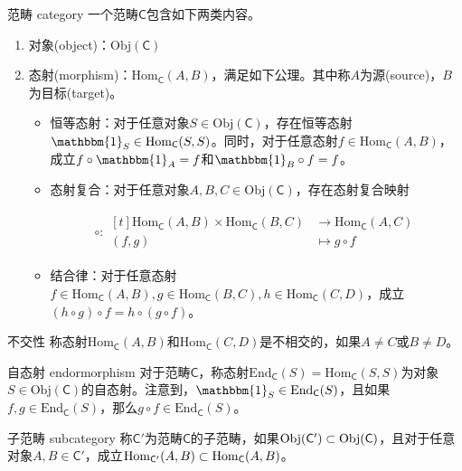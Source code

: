 \begin{definition}{范畴 category}
	一个范畴$\mathsf{C}$包含如下两类内容。
	\begin{enumerate}
		\item 对象(object)：$\mathrm{Obj}(\mathsf{C})$
		\item 态射(morphism)：$\mathrm{Hom}_\mathsf{C}(A,B)$，满足如下公理。其中称$A$为源(source)，$B$为目标(target)。
		\begin{itemize}
			\item 恒等态射：对于任意对象$S\in\mathrm{Obj}(\mathsf{C})$，存在恒等态射$\mathbbm{1}_S\in\mathrm{Hom}_\mathsf{C}(S,S)$。同时，对于任意态射$f\in \mathrm{Hom}_\mathsf{C}(A,B)$，成立$f\circ\mathbbm{1}_A=f$和$\mathbbm{1}_B\circ f=f$。
			\item 态射复合：对于任意对象$A,B,C\in\mathrm{Obj}(\mathsf{C})$，存在态射复合映射
			
		\begin{align*}
				\circ :\begin{aligned}[t]
					\mathrm{Hom}_\mathsf{C}(A,B)\times \mathrm{Hom}_\mathsf{C}(B,C)&\longrightarrow \mathrm{Hom}_\mathsf{C}(A,C)\\
					(f,g)&\longmapsto g\circ f
				\end{aligned}
			\end{align*}
			\item 结合律：对于任意态射$f\in \mathrm{Hom}_\mathsf{C}(A,B),g\in \mathrm{Hom}_\mathsf{C}(B,C),h\in \mathrm{Hom}_\mathsf{C}(C,D)$，成立$(h\circ g)\circ f=h\circ (g\circ f)$。
		\end{itemize}
	\end{enumerate}
\end{definition}

\begin{definition}{不交性}
	称态射$\mathrm{Hom}_\mathsf{C}(A,B)$和$\mathrm{Hom}_\mathsf{C}(C,D)$是不相交的，如果$A\ne C$或$B\ne D$。
\end{definition}

\begin{definition}{自态射 endormorphism}
	对于范畴$\mathsf{C}$，称态射$\mathrm{End}_\mathsf{C}(S)=\mathrm{Hom}_\mathsf{C}(S,S)$为对象$S\in\mathrm{Obj}(\mathsf{C})$的自态射。注意到，$\mathbbm{1}_S\in \mathrm{End}_\mathsf{C}(S)$，且如果$f,g\in\mathrm{End}_\mathsf{C}(S)$，那么$g\circ f\in\mathrm{End}_\mathsf{C}(S)$。
\end{definition}

\begin{definition}{子范畴 subcategory}
	称$\mathsf{C}'$为范畴$\mathsf{C}$的子范畴，如果$\mathrm{Obj}(\mathsf{C'})\subset\mathrm{Obj}(\mathsf{C})$，且对于任意对象$A,B\in\mathsf{C'}$，成立$\mathrm{Hom}_\mathsf{C'}(A,B)\subset\mathrm{Hom}_\mathsf{C}(A,B)$。
\end{definition}

